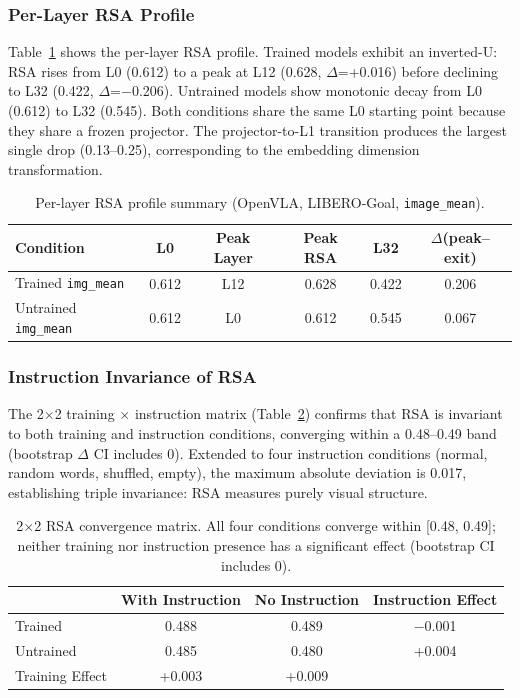 \documentclass[letterpaper]{article}
\begin{document}
\subsubsection{Per-Layer RSA Profile}
\label{sec:rsa-profile}

Table~\ref{tab:rsa-profile} shows the per-layer RSA profile.
Trained models exhibit an inverted-U: RSA rises from L0 (0.612) to a peak at L12 (0.628, $\Delta$=+0.016) before declining to L32 (0.422, $\Delta$=$-$0.206).
Untrained models show monotonic decay from L0 (0.612) to L32 (0.545).
Both conditions share the same L0 starting point because they share a frozen projector.
The projector-to-L1 transition produces the largest single drop (0.13--0.25), corresponding to the embedding dimension transformation.

\begin{table}[t]
\centering
\caption{Per-layer RSA profile summary (OpenVLA, LIBERO-Goal, \texttt{image\_mean}).}
\label{tab:rsa-profile}
\small
\begin{tabular}{lccccc}
\toprule
Condition & L0 & Peak Layer & Peak RSA & L32 & $\Delta$(peak--exit) \\
\midrule
Trained \texttt{img\_mean}   & 0.612 & L12 & 0.628 & 0.422 & 0.206 \\
Untrained \texttt{img\_mean} & 0.612 & L0  & 0.612 & 0.545 & 0.067 \\
\bottomrule
\end{tabular}
\end{table}

\subsubsection{Instruction Invariance of RSA}

The 2$\times$2 training $\times$ instruction matrix (Table~\ref{tab:2x2-rsa}) confirms that RSA is invariant to both training and instruction conditions, converging within a 0.48--0.49 band (bootstrap $\Delta$ CI includes 0).
Extended to four instruction conditions (normal, random words, shuffled, empty), the maximum absolute deviation is 0.017, establishing triple invariance: RSA measures purely visual structure.

\begin{table}[t]
\centering
\caption{2$\times$2 RSA convergence matrix. All four conditions converge within [0.48, 0.49]; neither training nor instruction presence has a significant effect (bootstrap CI includes 0).}
\label{tab:2x2-rsa}
\small
\begin{tabular}{lccc}
\toprule
 & With Instruction & No Instruction & Instruction Effect \\
\midrule
Trained   & 0.488 & 0.489 & $-$0.001 \\
Untrained & 0.485 & 0.480 & +0.004 \\
\midrule
Training Effect & +0.003 & +0.009 & \\
\bottomrule
\end{tabular}
\end{table}
\end{document}
